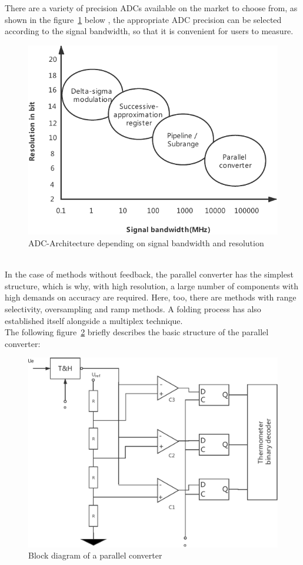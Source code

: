 There are a variety of precision ADCs available on the market to choose from, as shown in the figure~\ref{fig:2.2} below , the appropriate ADC precision can be selected according to the signal bandwidth, so that it is convenient for users to measure.
\begin{figure}[h]
	\centering
	\includegraphics[width=13cm]{grafiken/2.2.pdf}
	\caption{ADC-Architecture depending on signal bandwidth and resolution} 
	\label{fig:2.2}
\end{figure}
\\
In the case of methods without feedback, the parallel converter has the simplest structure, which is why, with high resolution, a large number of components with high demands on accuracy are required. Here, too, there are methods with range selectivity, oversampling and ramp methods. A folding process has also established itself alongside a multiplex technique. 
\\
The following figure~\ref{fig:2.3} briefly describes the basic structure of the parallel converter:
\begin{figure}[h]
	\centering
	\includegraphics[width=13cm]{grafiken/2.3.pdf}
	\caption{Block diagram of a parallel converter} 
	\label{fig:2.3}
\end{figure}
